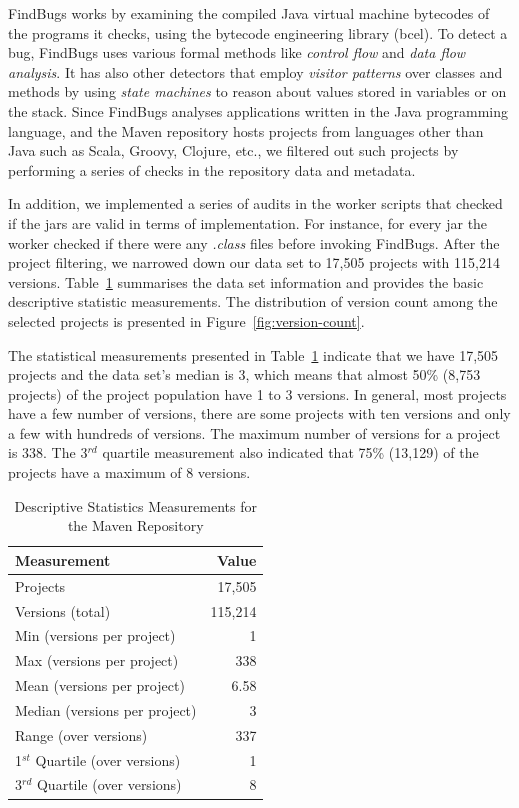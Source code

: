 \documentclass{sig-alternate}
\begin{document}
FindBugs works by examining the compiled Java virtual
machine bytecodes of the programs it checks, using the bytecode engineering
library ({\sc bcel}).
To detect a bug, FindBugs uses various formal methods like
{\it control flow} and {\it data flow
analysis}. It has also other detectors that employ {\it visitor patterns} over
classes and methods by using {\it state machines} to reason about values stored
in variables or on the stack.
Since FindBugs analyses applications written in the Java
programming language, and the Maven repository
hosts projects from languages other than Java such as Scala, Groovy,
Clojure, etc., we filtered out such projects by performing a series of checks in
the repository data and metadata.

In addition, we implemented a series of audits in the worker scripts that
checked if the {\sc jar}s are valid in terms of implementation. For instance,
for every {\sc jar} the worker checked if there were any {\it .class} files
before invoking FindBugs. After the project filtering, we narrowed down
our data set to 17,505 projects with 115,214 versions.
Table~\ref{tbl:repository} summarises the data set information and
provides the basic descriptive statistic measurements. The distribution of version
count among the selected projects is presented in Figure~\ref{fig:version-count}.

The statistical measurements presented in Table~\ref{tbl:repository}
indicate that we have 17,505 projects and the data set's median is 3,
which means that almost 50\% (8,753 projects) of the project
population have 1 to 3 versions. In general, most projects have a few
number of versions, there are some projects with ten versions and
only a few with hundreds of versions. The maximum number of versions
for a project is 338. The 3$^{rd}$ quartile measurement also indicated
that 75\% (13,129) of the projects have a maximum of 8 versions.

\begin{table}[t]
\centering
\caption{Descriptive Statistics Measurements for the Maven Repository}
\label{tbl:repository}
\begin{tabular}{l r}
\hline
Measurement & Value\\
 \hline
Projects & 17,505\\
Versions (total) & 115,214\\
Min (versions per project) & 1\\
Max (versions per project) & 338\\
Mean (versions per project) & 6.58\\
Median (versions per project) & 3\\
Range (over versions) & 337\\
1$^{st}$ Quartile (over versions) & 1\\
3$^{rd}$ Quartile (over versions) & 8\\
\hline
\end{tabular}
\end{table}
\end{document}
